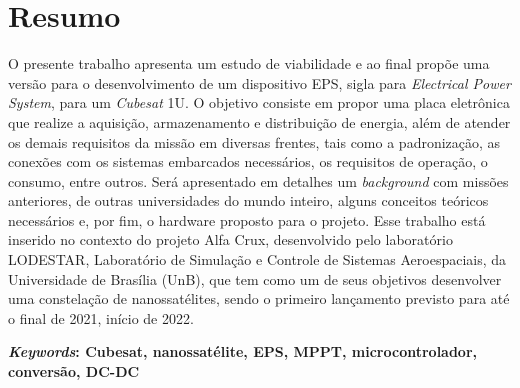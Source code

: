 \chapter*{Resumo}
O presente trabalho apresenta um estudo de viabilidade e ao final propõe uma versão para o desenvolvimento de um dispositivo EPS, sigla para \textit{Electrical Power System}, para um \textit{Cubesat} 1U. O objetivo consiste em propor uma placa eletrônica que realize a aquisição, armazenamento e distribuição de energia, além de atender os demais requisitos da missão em diversas frentes, tais como a padronização, as conexões com os sistemas embarcados necessários, os requisitos de operação, o consumo, entre outros. Será apresentado em detalhes um \textit{background} com missões anteriores, de outras universidades do mundo inteiro, alguns conceitos teóricos necessários e, por fim, o hardware proposto para o projeto. Esse trabalho está inserido no contexto do projeto Alfa Crux, desenvolvido pelo laboratório LODESTAR, Laboratório de Simulação e Controle de Sistemas Aeroespaciais, da Universidade de Brasília (UnB), que tem como um de seus objetivos desenvolver uma constelação de nanossatélites, sendo o primeiro lançamento previsto para até o final de 2021, início de 2022. 

\textbf{\textit{Keywords}: Cubesat, nanossatélite, EPS, MPPT, microcontrolador, conversão, DC-DC}
